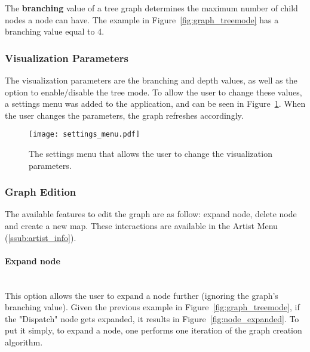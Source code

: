       The \textbf{branching} value of a tree graph determines the maximum number of child nodes a node can have.
      The example in Figure~\ref{fig:graph_treemode} has a branching value equal to 4.


    \subsubsection{Visualization Parameters} %
    \label{ssub:visualization_parameters}
    
    The visualization parameters are the branching and depth values, as well as the option to enable/disable the tree mode.
    To allow the user to change these values, a settings menu was added to the application, and can be seen in Figure~\ref{fig:settings_menu}.
    When the user changes the parameters, the graph refreshes accordingly.

    \begin{figure}[H]
      \begin{center}
        \texttt{[image: settings\_menu.pdf]}
      \end{center}
      \caption{The settings menu that allows the user to change the visualization parameters.}
      \label{fig:settings_menu} 
    \end{figure}


    \subsubsection{Graph Edition} %
      \label{ssub:edition}

      The available features to edit the graph are as follow: expand node, delete node and create a new map.
      These interactions are available in the Artist Menu (\ref{ssub:artist_info}).

      \paragraph{Expand node} \hfill \\
      This option allows the user to expand a node further (ignoring the graph's branching value).
      Given the previous example in Figure~\ref{fig:graph_treemode}, if the "Dispatch" node gets expanded, it results in Figure~\ref{fig:node_expanded}.
      To put it simply, to expand a node, one performs one iteration of the graph creation algorithm.

